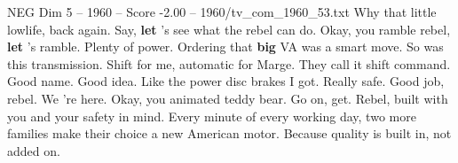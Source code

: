 \begin{textsample}{NEG Dim 5 – 1960 – Score -2.00 – 1960/tv\_com\_1960\_53.txt}  \label{ex:f5_neg_015}
Why that little lowlife, back again.
Say, \textbf{let} 's see what the rebel can do.
Okay, you ramble rebel, \textbf{let} 's ramble.
Plenty of power.
Ordering that \textbf{big} VA was a smart move.
So was this transmission.
Shift for me, automatic for Marge.
They call it shift command.
Good name.
Good idea.
Like the power disc brakes I got.
Really safe.
Good job, rebel.
We 're here.
Okay, you animated teddy bear.
Go on, get.
Rebel, built with you and your safety in mind.
Every minute of every working day, two more families make their choice a new American motor.
Because quality is built in, not added on.

\end{textsample}
